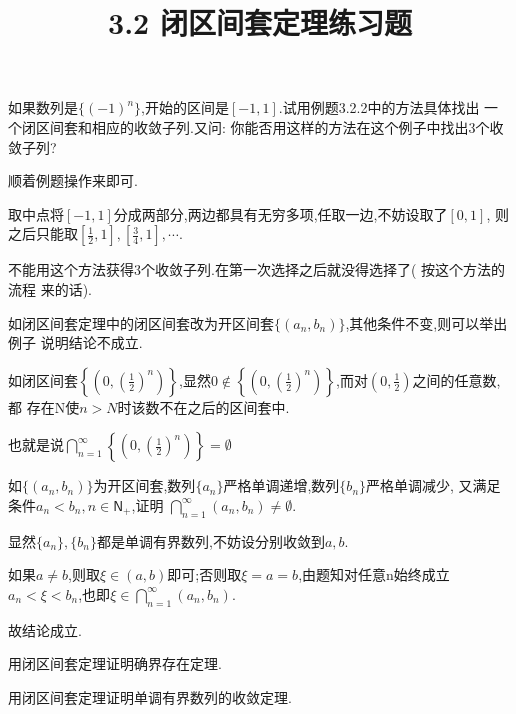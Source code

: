 \documentclass[windows,list,answers]{BHCexam}
\begin{document}
\everymath{\displaystyle}
\title{3.2 闭区间套定理\quad 练习题}

\maketitle

\begin{questions}
    \question
    如果数列是$\{(-1)^n\}$,开始的区间是$[-1,1]$.试用例题3.2.2中的方法具体找出
    一个闭区间套和相应的收敛子列.又问: 你能否用这样的方法在这个例子中找出3个收敛子列?
    \begin{solution}{1cm}
        \methodonly
        顺着例题操作来即可.

        取中点将$[-1,1]$分成两部分,两边都具有无穷多项,任取一边,不妨设取了$[0,1]$,
        则之后只能取$[\frac{1}{2},1],[\frac{3}{4},1],\cdots$.

        不能用这个方法获得3个收敛子列.在第一次选择之后就没得选择了( 按这个方法的流程
        来的话).
    \end{solution}

    \question
    如闭区间套定理中的闭区间套改为开区间套$\{(a_n,b_n)\}$,其他条件不变,则可以举出例子
    说明结论不成立.
    \begin{solution}{1cm}
        \methodonly
        如闭区间套$\left\{(0,(\frac{1}{2})^n)\right\}$,显然$0\notin 
        \left\{(0,(\frac{1}{2})^n)\right\}$,而对$(0,\frac{1}{2})$之间的任意数,都
        存在N使$n>N$时该数不在之后的区间套中.

        也就是说$\textstyle\bigcap_{n=1}^\infty\left\{(0,(\frac{1}{2})^n)\right\}=
        \emptyset $
    \end{solution}

    \question
    如$\{(a_n,b_n)\}$为开区间套,数列$\{a_n\}$严格单调递增,数列$\{b_n\}$严格单调减少,
    又满足条件$a_n<b_n,n\in \mathsf{N}_+$,证明
    $\textstyle\bigcap_{n=1}^\infty(a_n,b_n)\neq\emptyset$.
    \begin{solution}{1cm}
        \methodonly
        显然$\{a_n\},\{b_n\}$都是单调有界数列,不妨设分别收敛到$a,b$.

        如果$a\neq b$,则取$\xi \in (a,b)$即可;否则取$\xi=a=b$,由题知对任意n始终成立
        $a_n<\xi<b_n$,也即$\xi\in\textstyle\bigcap_{n=1}^\infty(a_n,b_n)$.

        故结论成立.
    \end{solution}

    \question
    用闭区间套定理证明确界存在定理.
    \begin{solution}{1cm}
        \methodonly
        
    \end{solution}
    
    \question
    用闭区间套定理证明单调有界数列的收敛定理.
    \begin{solution}{1cm}
        \methodonly
    \end{solution}

\end{questions}
\end{document}
